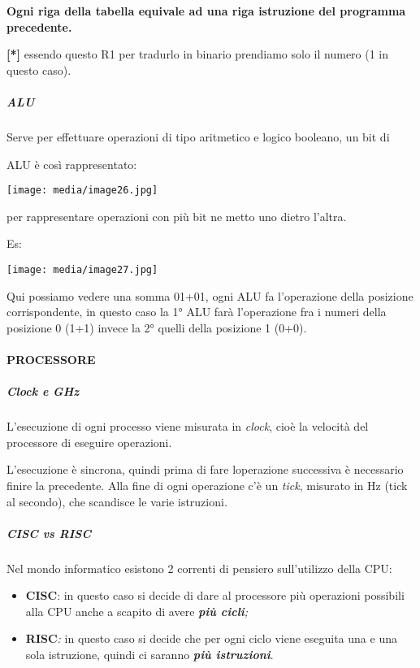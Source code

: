 \textbf{Ogni riga della tabella equivale ad una riga istruzione del
programma precedente.}

\textbf{{[}*{]}} essendo questo R1 per tradurlo in binario prendiamo
solo il numero (1 in questo caso).

\subparagraph{\texorpdfstring{\emph{ALU}}{ALU}}\label{alu}

Serve per effettuare operazioni di tipo aritmetico e logico booleano, un
bit di

ALU è così rappresentato:

\texttt{[image: media/image26.jpg]}

per rappresentare operazioni con più bit ne metto uno dietro l'altra.

Es:

\texttt{[image: media/image27.jpg]}

Qui possiamo vedere una somma 01+01, ogni ALU fa l'operazione della
posizione corrispondente, in questo caso la 1° ALU farà l'operazione fra
i numeri della posizione 0 (1+1) invece la 2° quelli della posizione 1
(0+0).

\paragraph{PROCESSORE}\label{processore}

\subparagraph{\texorpdfstring{\emph{Clock e
GHz}}{Clock e GHz}}\label{clock-e-ghz}

L'esecuzione di ogni processo viene misurata in \emph{clock}, cioè la
velocità del processore di eseguire operazioni.

L'esecuzione è sincrona, quindi prima di fare
l\textquotesingle operazione successiva è necessario finire la
precedente. Alla fine di ogni operazione c'è un \emph{tick}, misurato in
Hz (tick al secondo), che scandisce le varie istruzioni.

\subparagraph{\texorpdfstring{\emph{CISC vs
RISC}}{CISC vs RISC}}\label{cisc-vs-risc}

Nel mondo informatico esistono 2 correnti di pensiero sull'utilizzo
della CPU:

\begin{itemize}
\item
  \textbf{CISC}: in questo caso si decide di dare al processore più
  operazioni possibili alla CPU anche a scapito di avere
  \emph{\textbf{più cicli};}
\item
  \textbf{RISC}\emph{:} in questo caso si decide che per ogni ciclo
  viene eseguita una e una sola istruzione, quindi ci saranno
  \emph{\textbf{più istruzioni}}.
\end{itemize}

